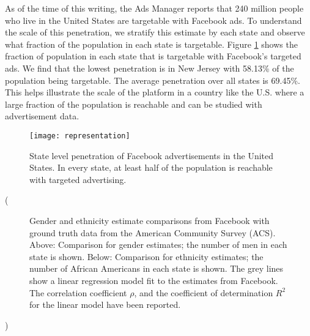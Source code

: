 As of the time of this writing, the Ads Manager reports that 240 million people who live in the United States are targetable with Facebook ads. To understand the scale of this penetration, we stratify this estimate by each state and observe what fraction of the population in each state is targetable. Figure \ref{fig:rep_map} shows the fraction of population in each state that is targetable with Facebook's targeted ads. We find that the lowest penetration is in New Jersey with 58.13\% of the population being targetable. The average penetration over all states is 69.45\%. This helps illustrate the scale of the platform in a country like the U.S. where a large fraction of the population is reachable and can be studied with advertisement data.

\begin{figure}
\centering
\texttt{[image: representation]}
\caption{State level penetration of Facebook advertisements in the United States. In every state, at least half of the population is reachable with targeted advertising.}
\label{fig:rep_map}
\end{figure}

\if(
\begin{figure}
    \centering
    \qquad

    \caption{Gender and ethnicity estimate comparisons from Facebook with ground truth data from the American Community Survey (ACS). Above: Comparison for gender estimates; the number of men in each state is shown. Below: Comparison for ethnicity estimates; the number of African Americans in each state is shown. The grey lines show a linear regression model fit to the estimates from Facebook. The correlation coefficient $\rho$, and the coefficient of determination $R^2$ for the linear model have been reported.}
    \label{fig:corrs}
\end{figure}
)\fi


